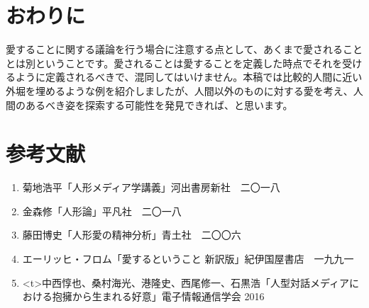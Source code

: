 \documentclass[b5j,twoside,twocolumn]{utarticle}
\begin{document}
\section{おわりに}
愛することに関する議論を行う場合に注意する点として、あくまで愛されることとは別ということです。愛されることは愛することを定義した時点でそれを受けるように定義されるべきで、混同してはいけません。本稿では比較的人間に近い外堀を埋めるような例を紹介しましたが、人間以外のものに対する愛を考え、人間のあるべき姿を探索する可能性を発見できれば、と思います。



\section*{参考文献}
{\small
\begin{enumerate}
\renewcommand{\labelenumi}{\pbox<y>{[\arabic{enumi}]}}
\item 菊地浩平「人形メディア学講義」河出書房新社　二〇一八
\item 金森修「人形論」平凡社　二〇一八
\item 藤田博史「人形愛の精神分析」青土社　二〇〇六
\item エーリッヒ・フロム「愛するということ 新訳版」紀伊国屋書店　一九九一
\item \pbox<t>{中西惇也、桑村海光、港隆史、西尾修一、石黒浩「人型対話メディアにおける抱擁から生まれる好意」電子情報通信学会 2016}
\end{enumerate}
}
\end{document}
